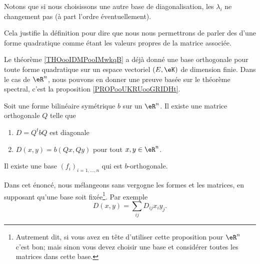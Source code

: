 Notons que si nous choisissons une autre base de diagonalisation, les \( \lambda_i\) ne changement pas (à part l'ordre éventuellement).

Cela justifie la définition pour dire que nous nous permettrons de parler des  d'une forme quadratique comme étant les valeurs propres de la matrice associée.


Le théorème \ref{THOooIDMPooIMwkqB} a déjà donné une base orthogonale pour toute forme quadratique sur un espace vectoriel \( (E,\eK)\) de dimension finie. Dans le cas de \( \eR^n\), nous pouvons en donner une preuve basée sur le théorème spectral, c'est la proposition \ref{PROPooUKRUooGRIDHt}.

\begin{proposition}     \label{PROPooUKRUooGRIDHt}
	Soit une forme bilinéaire symétrique \( b\) sur un \( \eR^n\). Il existe une matrice orthogonale \( Q\) telle que
	\begin{enumerate}
		\item
		      \( D=Q^tbQ\) est diagonale
		\item
		      \( D(x,y)=b(Qx,Qy)\) pour tout \( x,y\in \eR^n\).
	\end{enumerate}

	Il existe une base \( (f_i)_{i=1,\ldots, n}\) qui est \( b\)-orthogonale.

	Dans cet énoncé, nous mélangeons sans vergogne les formes et les matrices, en supposant qu'une base soit fixée\footnote{Autrement dit, si vous avez en tête d'utiliser cette proposition pour \( \eR^n\) c'est bon; mais sinon vous devez choisir une base et considérer toutes les matrices dans cette base.}. Par exemple
	\begin{equation}
		D(x,y)=\sum_{ij}D_{ij}x_iy_j.
	\end{equation}
\end{proposition}

